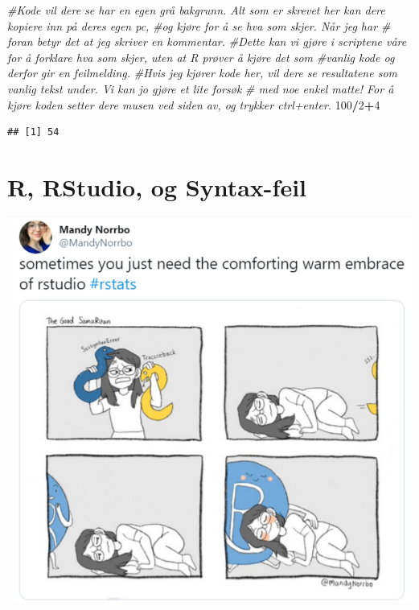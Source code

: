\documentclass[
]{article}
\newenvironment{Shaded}{\begin{snugshade}}{\end{snugshade}}
\newcommand{\CommentTok}[1]{\textcolor[rgb]{0.56,0.35,0.01}{\textit{#1}}}
\newcommand{\DecValTok}[1]{\textcolor[rgb]{0.00,0.00,0.81}{#1}}
\newcommand{\OperatorTok}[1]{\textcolor[rgb]{0.81,0.36,0.00}{\textbf{#1}}}
\begin{document}
\begin{Shaded}
\begin{Highlighting}[]
\CommentTok{#Kode vil dere se har en egen grå bakgrunn. Alt som er skrevet her kan dere kopiere inn på deres egen pc,}
\CommentTok{#og kjøre for å se hva som skjer. Når jeg har # foran betyr det at jeg skriver en kommentar. }
\CommentTok{#Dette kan vi gjøre i scriptene våre for å forklare hva som skjer, uten at R prøver å kjøre det som}
\CommentTok{#vanlig kode og derfor gir en feilmelding. }
\CommentTok{#Hvis jeg kjører kode her, vil dere se resultatene som vanlig tekst under. Vi kan jo gjøre et lite forsøk}
\CommentTok{# med noe enkel matte! For å kjøre koden setter dere musen ved siden av, og trykker ctrl+enter. }
\DecValTok{100}\OperatorTok{/}\DecValTok{2}\OperatorTok{+}\DecValTok{4}
\end{Highlighting}
\end{Shaded}

\begin{verbatim}
## [1] 54
\end{verbatim}

\hypertarget{r-rstudio-og-syntax-feil}{%
\section{R, RStudio, og Syntax-feil}\label{r-rstudio-og-syntax-feil}}

\includegraphics{Bilder/RStudio.png}
\end{document}
